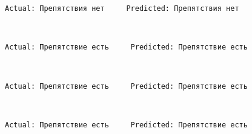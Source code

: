 \documentclass[11pt]{article}
\begin{document}
    \begin{Verbatim}[commandchars=\\\{\}]
Actual: Препятствия нет     Predicted: Препятствия нет

    \end{Verbatim}

    \begin{center}
    \end{center}
    { \hspace*{\fill} \\}
    
    \begin{Verbatim}[commandchars=\\\{\}]
Actual: Препятствие есть     Predicted: Препятствие есть

    \end{Verbatim}

    \begin{center}
    \end{center}
    { \hspace*{\fill} \\}
    
    \begin{Verbatim}[commandchars=\\\{\}]
Actual: Препятствие есть     Predicted: Препятствие есть

    \end{Verbatim}

    \begin{center}
    \end{center}
    { \hspace*{\fill} \\}
    
    \begin{Verbatim}[commandchars=\\\{\}]
Actual: Препятствие есть     Predicted: Препятствие есть

    \end{Verbatim}

    \begin{center}
    \end{center}
    { \hspace*{\fill} \\}
    
\end{document}
